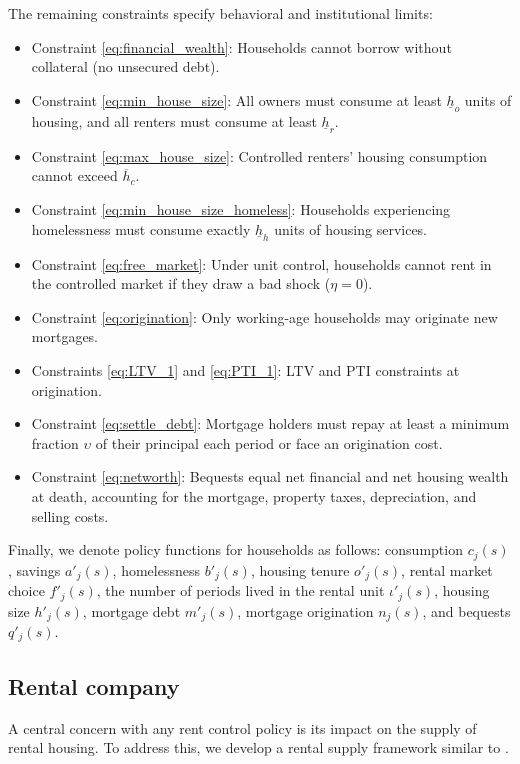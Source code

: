\documentclass[parskip=full]{article}
\begin{document}
The remaining constraints specify behavioral and institutional limits: 
\begin{itemize}
    \item Constraint \eqref{eq:financial_wealth}: Households cannot borrow without collateral (no unsecured debt).
    \item Constraint \eqref{eq:min_house_size}: All owners must consume at least $\underline{h}_{o}$ units of housing, and all renters must consume at least $\underline{h}_{r}$.
    \item Constraint \eqref{eq:max_house_size}: Controlled renters' housing consumption cannot exceed $\overline{h}_{c}$.
    \item Constraint \eqref{eq:min_house_size_homeless}: Households experiencing homelessness must consume exactly $\underline{h}_{h}$ units of housing services.
    \item Constraint \eqref{eq:free_market}: Under unit control, households cannot rent in the controlled market if they draw a bad shock ($\eta=0$). 
    \item Constraint \eqref{eq:origination}: Only working-age households may originate new mortgages.
    \item Constraints \eqref{eq:LTV_1} and \eqref{eq:PTI_1}: LTV and PTI constraints at origination.
    \item Constraint \eqref{eq:settle_debt}: Mortgage holders must repay at least a minimum fraction $\upsilon$ of their principal each period or face an origination cost.
    \item Constraint \eqref{eq:networth}: Bequests equal net financial and net housing wealth at death, accounting for the mortgage, property taxes, depreciation, and selling costs.
\end{itemize} 

Finally, we denote policy functions for households as follows: consumption $c_{j}(s)$, savings $a'_{j}(s)$, homelessness $b'_{j}(s)$, housing tenure $o'_{j}(s)$, rental market choice $f'_{j}(s)$, the number of periods lived in the rental unit $\iota'_{j}(s)$, housing size $h'_{j}(s)$, mortgage debt $m'_{j}(s)$, mortgage origination $n_{j}(s)$, and bequests $q'_{j}(s)$.

\subsection{Rental company}\label{sec:rental_company}

A central concern with any rent control policy is its impact on the supply of rental housing. To address this, we develop a rental supply framework similar to \citet{garrigaeetal-2009}.
\end{document}
